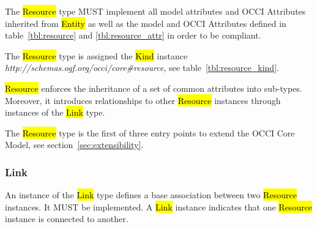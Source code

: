 \documentclass[10pt,a4paper]{article}
\begin{document}
The \hl{Resource} type MUST implement all model attributes and OCCI Attributes
inherited from
\hl{Entity} as well as the model and OCCI Attributes defined in
table~\ref{tbl:resource} and \ref{tbl:resource_attr} in order to be compliant.


The \hl{Resource} type is assigned the \hl{Kind} instance
\textit{http://schemas.ogf.org/occi/core\#resource}, see
table~\ref{tbl:resource_kind}.
%

\hl{Resource} enforces the inheritance of a set of common attributes
into sub-types. Moreover, it introduces relationships to other
\hl{Resource} instances through instances of the \hl{Link} type.

The \hl{Resource} type is the first of three entry points to extend
the OCCI Core Model, see section~\ref{sec:extensibility}.

\subsubsection{Link}
\label{sec:link}
An instance of the \hl{Link} type defines a base association between
two \hl{Resource} instances. It MUST be implemented. A \hl{Link}
instance indicates that one \hl{Resource} instance is connected to
another.
\end{document}
